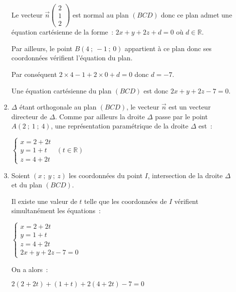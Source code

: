 \begin{corrige}
\begin{enumerate}
\begin{enumerate}[label=\alph*.]
               Le vecteur $\overrightarrow{n}\begin{pmatrix}2\\1\\2\end{pmatrix}$ est normal au plan $(BCD)$ donc ce plan admet une équation cartésienne de la forme~: $2x+y+2z+d=0$ où $d \in \mathbb{R}$.
               \par
               Par ailleurs, le point $B(4~;~-1~;~0)$ appartient à ce plan donc ses coordonnées vérifient l'équation du plan.
               \par
               Par conséquent $2 \times 4 -1+2 \times 0+d=0$ donc $d=-7$.
               \par
               Une équation cartésienne du plan $(BCD)$ est donc $2x+y+2z-7=0$.
               \item
               $\Delta$ étant orthogonale au plan $(BCD)$, le vecteur $\overrightarrow{n}$ est un vecteur directeur de $\Delta$. Comme par ailleurs la droite $\Delta$ passe par le point $A(2~;~1~;~4)$, une représentation paramétrique de la droite  $\Delta$ est~:
               \begin{center}
                    $\begin{cases}
                         x=2+2t\\y=1+t\\z=4+2t
                    \end{cases}~~(t\in \mathbb{R})$
               \end{center}
               \item
               Soient $(x~;~y~;~z)$ les coordonnées du point $I$, intersection de la droite $\Delta$ et du plan $(BCD)$.
               \par
               Il existe une valeur de $t$ telle que les coordonnées de $I$ vérifient simultanément les équations~:
               \par
               \begin{center}
                    $\begin{cases}
                         x=2+2t\\y=1+t\\z=4+2t\\2x+y+2z-7=0
                    \end{cases}$
               \end{center}
               On a alors~:
               \par
               $2(2+2t)+(1+t)+2(4+2t)-7=0$
               \par

\end{enumerate}
\end{enumerate}
\end{corrige}
